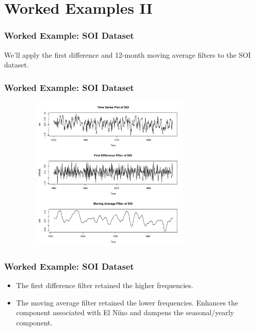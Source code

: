 \documentclass[%
xcolor=pdftex]{beamer}
\begin{document}
\section{Worked Examples II}
\frame{\tableofcontents[currentsection]}

\begin{frame}
\frametitle{Worked Example: SOI Dataset}

We'll apply the first difference and 12-month moving average filters to the SOI dataset.

\end{frame}

\begin{frame}
\frametitle{Worked Example: SOI Dataset}

\includegraphics[width=110mm, height=75mm]{ts.pdf}

\end{frame}



\begin{frame}
\frametitle{Worked Example: SOI Dataset}

\begin{itemize}
\item The first difference filter retained the higher frequencies.
\item The moving average filter retained the lower frequencies. Enhances the component associated with El Ni$\tilde{\text{n}}$o and dampens the seasonal/yearly component.
\end{itemize}

\end{frame}
\end{document}

